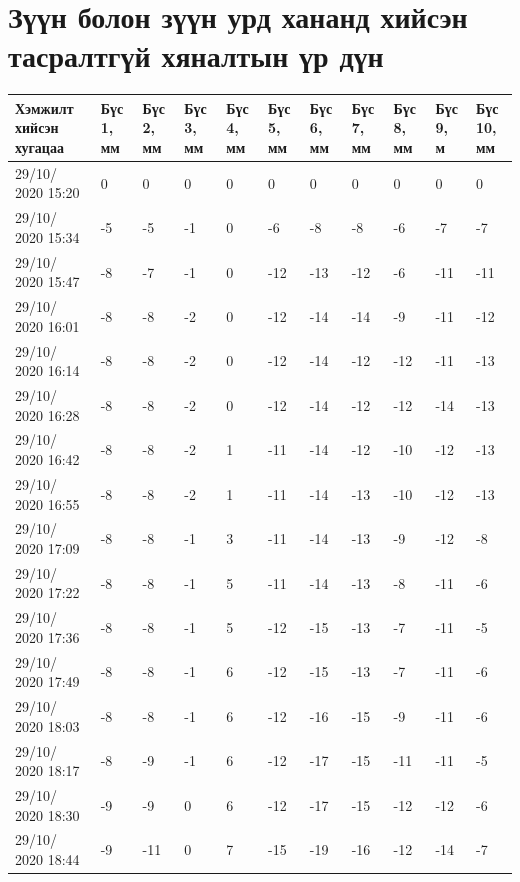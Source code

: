 
\chapter{Зүүн болон зүүн урд хананд хийсэн тасралтгүй хяналтын үр дүн} %

\label{AppendixA} %
\pagecolor{white}
\begin{table}[h]
    \centering
    \begin{tabular}{|p{1.5cm}|p{0.8cm}|p{0.8cm}|p{0.8cm}|p{0.8cm}|p{0.8cm}|p{0.8cm}|p{0.8cm}|p{0.8cm}|p{0.8cm}|p{0.8cm}|}
         \hline
     Хэмжилт хийсэн хугацаа & Бүс 1, мм&	Бүс 2, мм&	Бүс 3, мм&	Бүс 4, мм&	Бүс 5, мм&	Бүс 6, мм&	Бүс 7, мм&	Бүс 8, мм&	Бүс 9, м&	Бүс 10, мм\\ \hline
     29/10/ 2020 15:20&	0&	0&	0&	0&	0&	0&	0&	0&	0&	0 \\ \hline
    29/10/ 2020 15:34&	-5&	-5&	-1&	0&	-6&	-8&	-8&	-6&	-7&	-7\\ \hline
    29/10/ 2020 15:47&	-8&	-7&	-1&	0&	-12&	-13&	-12&	-6&	-11&	-11\\ \hline
    29/10/ 2020 16:01&	-8&	-8&	-2&	0&	-12&	-14&	-14&	-9&	-11&	-12\\ \hline
    29/10/ 2020 16:14&	-8&	-8&	-2&	0&	-12&	-14&	-12&	-12&	-11&	-13\\ \hline
    29/10/ 2020 16:28&	-8&	-8&	-2&	0&	-12&	-14&	-12&	-12&	-14&	-13\\ \hline
    29/10/ 2020 16:42&	-8&	-8&	-2&	1&	-11&	-14&	-12&	-10&	-12&	-13\\ \hline
    29/10/ 2020 16:55&	-8&	-8&	-2&	1&	-11&	-14&	-13&	-10&	-12&	-13\\ \hline
    29/10/ 2020 17:09&	-8&	-8&	-1&	3&	-11&	-14&	-13&	-9&	-12&	-8\\ \hline
    29/10/ 2020 17:22&	-8&	-8&	-1&	5&	-11&	-14&	-13&	-8&	-11&	-6\\ \hline
    29/10/ 2020 17:36&	-8&	-8&	-1&	5&	-12&	-15&	-13&	-7&	-11&	-5\\ \hline
    29/10/ 2020 17:49&	-8&	-8&	-1&	6&	-12&	-15&	-13&	-7&	-11&	-6\\ \hline
29/10/ 2020 18:03&	-8&	-8&	-1&	6&	-12&	-16&	-15&	-9&	-11&	-6\\ \hline
29/10/ 2020 18:17&	-8&	-9&	-1&	6&	-12&	-17&	-15&	-11&	-11&	-5\\ \hline
29/10/ 2020 18:30&	-9&	-9&	0&	6&	-12&	-17&	-15&	-12&	-12&	-6\\ \hline
29/10/ 2020 18:44&	-9&	-11&	0&	7&	-15&	-19&	-16&	-12&	-14&	-7\\ \hline
    \end{tabular}
\end{table}
